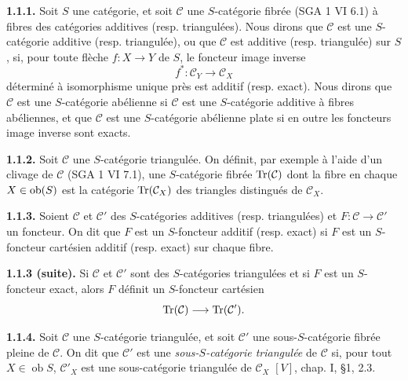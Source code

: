 \documentclass[11pt]{article}
\providecommand{\cC}{\mathcal C}
\providecommand{\Coker}{\operatorname{Coker}}
\providecommand{\Ker}{\operatorname{Ker}}
\providecommand{\cO}{\mathcal O}
\begin{document}
\textbf{1.1.1.} Soit \(S\) une catégorie, et soit \(\mathcal C\) une \(S\)-catégorie fibrée (SGA 1 VI 6.1) à fibres des catégories additives (resp. triangulées). Nous dirons que \(\mathcal C\) est une \(S\)-catégorie additive (resp. triangulée), ou que \(\mathcal C\) est additive (resp. triangulée) sur \(S\), si, pour toute flèche \(f:X\to Y\) de \(S\), le foncteur image inverse
\[
  f^*:\mathcal C_Y\longrightarrow \mathcal C_X
\]
déterminé à isomorphisme unique près est additif (resp. exact). Nous dirons que \(\mathcal C\) est une \(S\)-catégorie abélienne si \(\mathcal C\) est une \(S\)-catégorie additive à fibres abéliennes, et que \(\mathcal C\) est une \(S\)-catégorie abélienne plate si en outre les foncteurs image inverse sont exacts.

\textbf{1.1.2.} Soit \(\mathcal C\) une \(S\)-catégorie triangulée. On définit, par exemple à l'aide d'un clivage de \(\mathcal C\) (SGA 1 VI 7.1), une \(S\)-catégorie fibrée \(\operatorname{Tr}(\mathcal C)\) dont la fibre en chaque \(X\in \operatorname{ob}(S)\) est la catégorie \(\operatorname{Tr}(\mathcal C_X)\) des triangles distingués de \(\mathcal C_X\).

\textbf{1.1.3.} Soient \(\mathcal C\) et \(\mathcal C'\) des \(S\)-catégories additives (resp. triangulées) et \(F:\mathcal C\to\mathcal C'\) un foncteur. On dit que \(F\) est un \(S\)-foncteur additif (resp. exact) si \(F\) est un \(S\)-foncteur cartésien additif (resp. exact) sur chaque fibre.



\providecommand{\cC}{\mathcal C}
\providecommand{\cD}{\mathcal D}
\providecommand{\cK}{\mathcal K}
\providecommand{\cO}{\mathcal O}
\providecommand{\cS}{\mathcal S}
\providecommand{\Cpx}{\mathrm C}
\providecommand{\Kpx}{\mathrm K}
\providecommand{\Dpx}{\mathrm D}
\providecommand{\Ho}{\mathrm H}
\providecommand{\Ob}{\operatorname{ob}}
\providecommand{\Coker}{\operatorname{Coker}}
\providecommand{\Ker}{\operatorname{Ker}}
\providecommand{\Im}{\operatorname{Im}}
\providecommand{\Hom}{\operatorname{Hom}}
\providecommand{\Cone}{\operatorname{Cone}}
\providecommand{\id}{\operatorname{Id}}
\providecommand{\qis}{\xrightarrow{\sim}}


\textbf{1.1.3 (suite).} Si \(\mathcal C\) et \(\mathcal C'\) sont des \(S\)-catégories triangulées et si \(F\) est un \(S\)-foncteur exact, alors \(F\) définit un \(S\)-foncteur cartésien
\[
  \operatorname{Tr}(\mathcal C)\longrightarrow \operatorname{Tr}(\mathcal C').
\]

\textbf{1.1.4.} Soit \(\mathcal C\) une \(S\)-catégorie triangulée, et soit \(\mathcal C'\) une sous-\(S\)-catégorie fibrée pleine de \(\mathcal C\). On dit que \(\mathcal C'\) est une \emph{sous-\(S\)-catégorie triangulée} de \(\mathcal C\) si, pour tout \(X\in\Ob S\), \(\mathcal C'_X\) est une sous-catégorie triangulée de \(\mathcal C_X\) \([V]\), chap. I, §1, 2.3.
\end{document}
